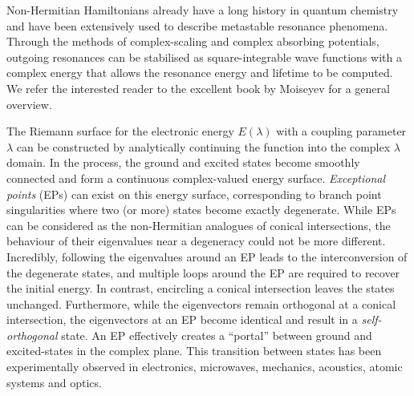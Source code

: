 \documentclass[aps,prb,reprint,noshowkeys,superscriptaddress]{revtex4-1}
\begin{document}
Non-Hermitian Hamiltonians already have a long history in quantum chemistry and have been extensively used to 
describe metastable resonance phenomena.\cite{MoiseyevBook}
Through the methods of complex-scaling\cite{Moiseyev_1998} and complex absorbing 
potentials,\cite{Riss_1993,Ernzerhof_2006,Benda_2018} outgoing resonances can be stabilised as square-integrable
wave functions with a complex energy that allows the resonance energy and lifetime to be computed.
We refer the interested reader to the excellent book by Moiseyev for a general overview. \cite{MoiseyevBook}

The Riemann surface for the electronic energy $E(\lambda)$ with a coupling parameter $\lambda$ can be 
constructed by analytically continuing the function into the complex $\lambda$ domain.
In the process, the ground and excited states become smoothly connected and form a continuous complex-valued
energy surface. 
\textit{Exceptional points} (EPs) can exist on this energy surface, corresponding to branch point 
singularities where two (or more) states become exactly degenerate.%
\cite{MoiseyevBook,Heiss_1988,Heiss_1990,Heiss_1999,Berry_2011,Heiss_2012,Heiss_2016,Benda_2018}
While EPs can be considered as the non-Hermitian analogues of conical intersections,\cite{Yarkony_1996} 
the behaviour of their eigenvalues near a degeneracy could not be more different.
Incredibly, following the eigenvalues around an EP leads to the interconversion of the degenerate states, 
and multiple loops around the EP are required to recover the initial energy.\cite{MoiseyevBook,Heiss_2016,Benda_2018}
In contrast, encircling a conical intersection leaves the states unchanged.
Furthermore, while the eigenvectors remain orthogonal at a conical intersection, the eigenvectors at an EP
become identical and result in a \textit{self-orthogonal} state. \cite{MoiseyevBook}
An EP effectively creates a ``portal'' between ground and excited-states in the complex plane.%
\cite{Burton_2019,Burton_2019a}
This transition between states has been experimentally observed in electronics, 
microwaves, mechanics, acoustics, atomic systems and optics.\cite{Bittner_2012,Chong_2011,Chtchelkatchev_2012,Doppler_2016,Guo_2009,Hang_2013,Liertzer_2012,Longhi_2010,Peng_2014, Peng_2014a,Regensburger_2012,Ruter_2010,Schindler_2011,Szameit_2011,Zhao_2010,Zheng_2013,Choi_2018,El-Ganainy_2018}
\end{document}
